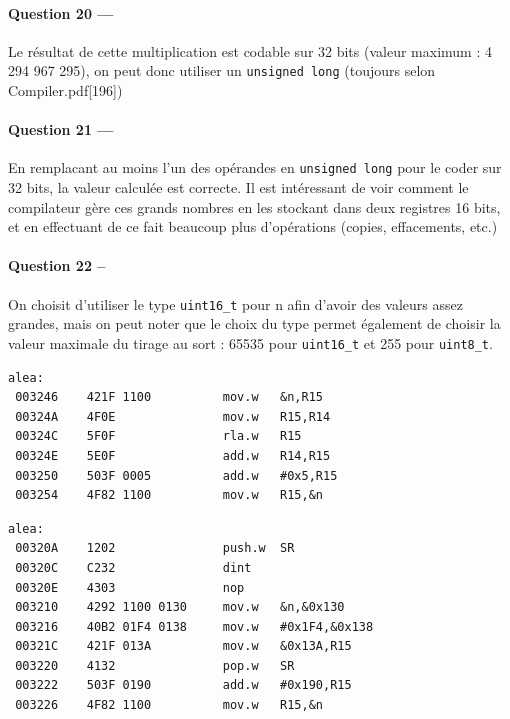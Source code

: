 \documentclass[a4paper,11pt,article]{memoir}
\begin{document}
\paragraph{Question 20 ---}  Le résultat de cette multiplication est codable sur 32 bits (valeur maximum : 4 294 967 295), on peut donc utiliser un \verb|unsigned long| (toujours selon Compiler.pdf[196])

\paragraph{Question 21 ---}  En remplacant au moins l'un des opérandes en \verb|unsigned long| pour le coder sur 32 bits, la valeur calculée est correcte. Il est intéressant de voir comment le compilateur gère ces grands nombres en les stockant dans deux registres 16 bits, et en effectuant de ce fait beaucoup plus d'opérations (copies, effacements, etc.)

\paragraph{Question 22 --}  On choisit d'utiliser le type \verb|uint16_t| pour n afin d'avoir des valeurs assez grandes, mais on peut noter que le choix du type permet également de choisir la valeur maximale du tirage au sort : 65535 pour \verb|uint16_t| et 255 pour \verb|uint8_t|.

\begin{verbatim}
alea:
 003246    421F 1100          mov.w   &n,R15
 00324A    4F0E               mov.w   R15,R14
 00324C    5F0F               rla.w   R15
 00324E    5E0F               add.w   R14,R15
 003250    503F 0005          add.w   #0x5,R15
 003254    4F82 1100          mov.w   R15,&n
\end{verbatim}

\begin{verbatim}
alea:
 00320A    1202               push.w  SR
 00320C    C232               dint
 00320E    4303               nop
 003210    4292 1100 0130     mov.w   &n,&0x130
 003216    40B2 01F4 0138     mov.w   #0x1F4,&0x138
 00321C    421F 013A          mov.w   &0x13A,R15
 003220    4132               pop.w   SR
 003222    503F 0190          add.w   #0x190,R15
 003226    4F82 1100          mov.w   R15,&n
\end{verbatim}
\end{document}
